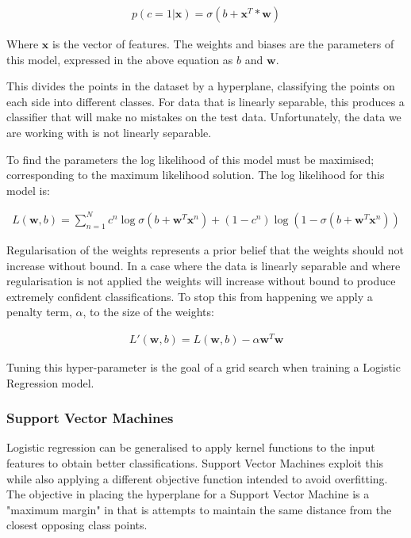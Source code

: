 \begin{align}
    p(c=1|\pmb{x}) = \sigma(b + \pmb{x}^{T}*\pmb{w})
\end{align}

Where $\pmb{x}$ is the vector of features.
The weights and biases are the parameters of this model, expressed in the above equation as $b$ and $\pmb{w}$.

This divides the points in the dataset by a hyperplane, classifying the points on each side into different classes.
For data that is linearly separable, this produces a classifier that will make no mistakes on the test data.
Unfortunately, the data we are working with is not linearly separable.

To find the parameters the log likelihood of this model must be maximised; corresponding to the maximum likelihood solution.
The log likelihood for this model is:

\begin{align}
    L(\pmb{w},b) = \sum_{n=1}^{N} c^{n} \log \sigma(b + \pmb{w}^{T}\pmb{x}^{n}) + (1 - c^{n})\log (1 - \sigma(b + \pmb{w}^{T}\pmb{x}^{n}))
\end{align}

Regularisation of the weights represents a prior belief that the weights should not increase without bound.
In a case where the data is linearly separable and where regularisation is not applied the weights will increase without bound to produce extremely confident classifications\autocite[381]{barber_bayesian_2013}.
To stop this from happening we apply a penalty term, $\alpha$, to the size of the weights:

\begin{align}
    L'(\pmb{w},b) = L(\pmb{w},b) - \alpha \pmb{w}^{T}\pmb{w}
\end{align}

Tuning this hyper-parameter is the goal of a grid search when training a Logistic Regression model.

\subsubsection{Support Vector Machines}

Logistic regression can be generalised to apply kernel functions to the input features to obtain better classifications.
Support Vector Machines exploit this while also applying a different objective function intended to avoid overfitting\autocite[383]{murphy_machine_2012}.
The objective in placing the hyperplane for a Support Vector Machine is a "maximum margin" in that is attempts to maintain the same distance from the closest opposing class points.

